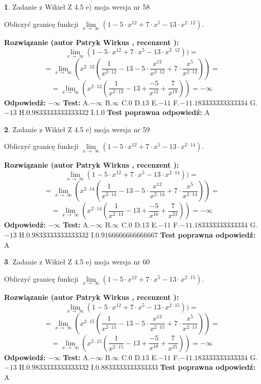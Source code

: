 \documentclass[12pt, a4paper]{article}
\theoremstyle{definition} %
\newtheorem{zad}{}
\newcommand{\zadStart}[1]{\begin{zad}#1\newline}
\newcommand{\zadStop}{\end{zad}}
\newcommand{\rozwStart}[2]{\noindent \textbf{Rozwiązanie (autor #1 , recenzent #2): }\newline}
\newcommand{\rozwStop}{\newline}
\newcommand{\odpStart}{\noindent \textbf{Odpowiedź:}\newline}
\newcommand{\odpStop}{\newline}
\newcommand{\testStart}{\noindent \textbf{Test:}\newline}
\newcommand{\testStop}{\newline}
\newcommand{\kluczStart}{\noindent \textbf{Test poprawna odpowiedź:}\newline}
\newcommand{\kluczStop}{\newline}
\begin{document}
\zadStart{Zadanie z Wikieł Z 4.5 e) moja wersja nr 58}


Obliczyć granicę funkcji  $\lim\limits_{x\to\ \infty}(1 - 5 \cdot x^{12}+7 \cdot x^{5}- 13 \cdot x^{2\cdot12})$.
\zadStop
\rozwStart{Patryk Wirkus}{}
$$\lim\limits_{x\to\ \infty}(1 - 5 \cdot x^{12}+7 \cdot x^{5}- 13 \cdot x^{2\cdot12}))=$$
$$=\lim\limits_{x\to\ \infty}(x^{2\cdot12}(\frac{1}{x^{2\cdot12}}-13 -5 \cdot \frac{x^{12}}{x^{2\cdot12}}+7 \cdot \frac{x^{5}}{x^{2\cdot12}}))=$$
$$=\lim\limits_{x\to\ \infty}(x^{2\cdot12}(\frac{1}{x^{2\cdot12}}-13 + \frac{-5}{x^{12}}+ \frac{7}{x^{19}}))=-\infty$$
\rozwStop
\odpStart
$-\infty$
\odpStop
\testStart
A.$-\infty$ B.$\infty$ C.$0$ D.$13$ E.$-11$
F.$-11.183333333333334$ G.$-13$
H.$0.9833333333333332$
I.$1.0$
\testStop
\kluczStart
A
\kluczStop



\zadStart{Zadanie z Wikieł Z 4.5 e) moja wersja nr 59}


Obliczyć granicę funkcji  $\lim\limits_{x\to\ \infty}(1 - 5 \cdot x^{12}+7 \cdot x^{5}- 13 \cdot x^{2\cdot14})$.
\zadStop
\rozwStart{Patryk Wirkus}{}
$$\lim\limits_{x\to\ \infty}(1 - 5 \cdot x^{12}+7 \cdot x^{5}- 13 \cdot x^{2\cdot14}))=$$
$$=\lim\limits_{x\to\ \infty}(x^{2\cdot14}(\frac{1}{x^{2\cdot14}}-13 -5 \cdot \frac{x^{12}}{x^{2\cdot14}}+7 \cdot \frac{x^{5}}{x^{2\cdot14}}))=$$
$$=\lim\limits_{x\to\ \infty}(x^{2\cdot14}(\frac{1}{x^{2\cdot14}}-13 + \frac{-5}{x^{16}}+ \frac{7}{x^{23}}))=-\infty$$
\rozwStop
\odpStart
$-\infty$
\odpStop
\testStart
A.$-\infty$ B.$\infty$ C.$0$ D.$13$ E.$-11$
F.$-11.183333333333334$ G.$-13$
H.$0.9833333333333332$
I.$0.9166666666666667$
\testStop
\kluczStart
A
\kluczStop



\zadStart{Zadanie z Wikieł Z 4.5 e) moja wersja nr 60}


Obliczyć granicę funkcji  $\lim\limits_{x\to\ \infty}(1 - 5 \cdot x^{12}+7 \cdot x^{5}- 13 \cdot x^{2\cdot15})$.
\zadStop
\rozwStart{Patryk Wirkus}{}
$$\lim\limits_{x\to\ \infty}(1 - 5 \cdot x^{12}+7 \cdot x^{5}- 13 \cdot x^{2\cdot15}))=$$
$$=\lim\limits_{x\to\ \infty}(x^{2\cdot15}(\frac{1}{x^{2\cdot15}}-13 -5 \cdot \frac{x^{12}}{x^{2\cdot15}}+7 \cdot \frac{x^{5}}{x^{2\cdot15}}))=$$
$$=\lim\limits_{x\to\ \infty}(x^{2\cdot15}(\frac{1}{x^{2\cdot15}}-13 + \frac{-5}{x^{18}}+ \frac{7}{x^{25}}))=-\infty$$
\rozwStop
\odpStart
$-\infty$
\odpStop
\testStart
A.$-\infty$ B.$\infty$ C.$0$ D.$13$ E.$-11$
F.$-11.183333333333334$ G.$-13$
H.$0.9833333333333332$
I.$0.8833333333333333$
\testStop
\kluczStart
A
\kluczStop
\end{document}

